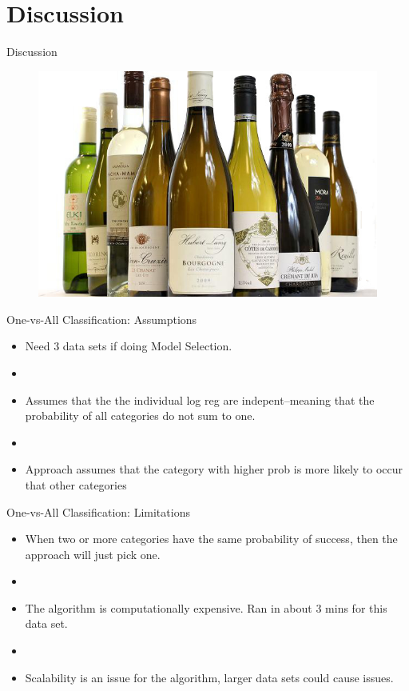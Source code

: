 \documentclass{beamer}
\begin{document}
\section{Discussion}
\begin{frame}{Discussion}
	\begin{figure}
		\centering
		\includegraphics[width=\textwidth]{../images/wines.jpg}
	\end{figure}
\end{frame}

\begin{frame}{One-vs-All Classification: Assumptions}
	\begin{itemize}
	\item Need 3 data sets if doing Model Selection. 
	\item[]
	\item Assumes that the the individual log reg are indepent--meaning that the probability of all categories do not sum to one. 
	\item[]
	\item Approach assumes that the category with higher prob is more likely to occur that other categories
	\end{itemize}
\end{frame}

\begin{frame}{One-vs-All Classification: Limitations}
	\begin{itemize}

	 \item When two or more categories have the same probability of success, then the approach will just pick one. 
	 \item[]
	 \item The algorithm is computationally expensive. Ran in about 3 mins for this data set.
	 \item[]
	 \item Scalability is an issue for the algorithm, larger data sets could cause issues.
	\end{itemize}

\end{frame}
\end{document}
